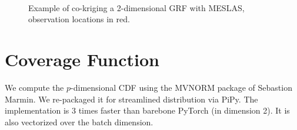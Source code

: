 \documentclass[a4paper,10pt]{article}
\begin{document}
\begin{figure}[tbh!p]
\centering
{}\\
\caption{Example of co-kriging a 2-dimensional GRF with MESLAS, observation locations in red.}
\label{fig:example_inv_prob}
\end{figure}

\newpage

\section{Coverage Function}
We compute the $p$-dimensional CDF using the MVNORM package of Sebastion Marmin. We re-packaged it for streamlined distribution via PiPy. The implementation is $3$ times faster than barebone PyTorch (in dimension 2). It is also vectorized over the batch dimension.
\end{document}
